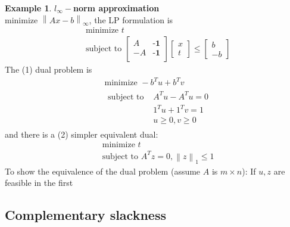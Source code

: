 \documentclass[10pt]{article}
\theoremstyle{definition}
\newtheorem{example}{Example}[section]
\newcommand{\norm}[1]{\left\lVert#1\right\rVert} %
\begin{document}
\begin{example} \textbf{$l_{\infty}-$norm approximation}\\
	minimize $\norm{Ax-b}_{\infty}$, the LP formulation is 
	\begin{equation*}
		\begin{split}
			& \text{minimize } t \\
			& \text{subject to } 
			\begin{bmatrix}
				A & \textbf{-1} \\
				-A & \textbf{-1} \\
			\end{bmatrix}
			\begin{bmatrix}
				x \\ t
			\end{bmatrix}
			\le
			\begin{bmatrix}
				b \\ -b
			\end{bmatrix}
		\end{split}
	\end{equation*}
	The (1) dual problem is 
	\begin{equation*}
		\begin{split}
			& \text{minimize } -b^Tu + b^Tv \\
			& \begin{split}
				\text{subject to } & A^Tu -A^Tu = 0\\
				& 1^Tu + 1^Tv = 1\\
				& u \ge 0, v \ge 0
			\end{split}	
		\end{split}
	\end{equation*}
	and there is a (2) simpler equivalent dual:
	\begin{equation*}
		\begin{split}
			& \text{minimize } t \\
			& \text{subject to } A^Tz = 0, \norm{z}_{1} \le 1
		\end{split}
	\end{equation*}
	To show the equivalence of the dual problem (assume $A$ is $m \times n$):
	If $u, z$ are feasible in the first 
\end{example}



\subsection{Complementary slackness}
\end{document}
